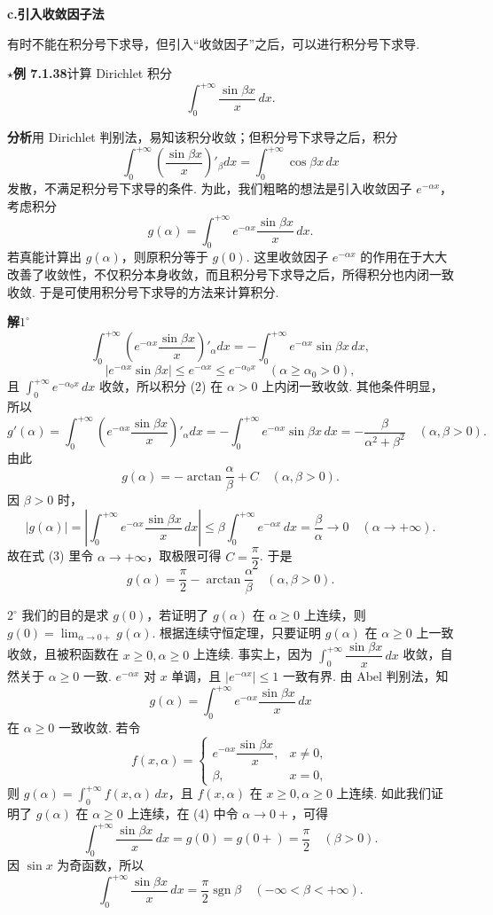 \documentclass[UTF8,12pt,a4paper,fontset=fandol]{ctexart}
\begin{document}
\noindent\textbf{c.\quad 引入收敛因子法}

有时不能在积分号下求导，但引入“收敛因子”之后，可以进行积分号下求导.

\noindent\textbf{$\star$例 7.1.38}\quad 计算 Dirichlet 积分
\[
\int_0^{+\infty}\frac{\sin\beta x}{x}\,dx.
\]

\noindent\textbf{分析}\quad 用 Dirichlet 判别法，易知该积分收敛；但积分号下求导之后，积分
\[
\int_0^{+\infty}\left(\frac{\sin\beta x}{x}\right)'_\beta dx
=\int_0^{+\infty}\cos\beta x\,dx
\]
发散，不满足积分号下求导的条件. 为此，我们粗略的想法是引入收敛因子 $e^{-\alpha x}$，考虑积分
\[
g(\alpha)=\int_0^{+\infty}e^{-\alpha x}\frac{\sin\beta x}{x}\,dx.
\tag{1}
\]
若真能计算出 $g(\alpha)$，则原积分等于 $g(0)$. 这里收敛因子 $e^{-\alpha x}$ 的作用在于大大改善了收敛性，不仅积分本身收敛，而且积分号下求导之后，所得积分也内闭一致收敛. 于是可使用积分号下求导的方法来计算积分.

\noindent\textbf{解}\quad $1^\circ$
\[
\int_0^{+\infty}\left(e^{-\alpha x}\frac{\sin\beta x}{x}\right)'_\alpha dx
=-\int_0^{+\infty}e^{-\alpha x}\sin\beta x\,dx,
\tag{2}
\]
\[
|e^{-\alpha x}\sin\beta x|\le e^{-\alpha x}\le e^{-\alpha_0x}\quad(\alpha\ge\alpha_0>0),
\]
且 $\displaystyle\int_0^{+\infty}e^{-\alpha_0x}\,dx$ 收敛，所以积分 (2) 在 $\alpha>0$ 上内闭一致收敛. 其他条件明显，所以
\[
g'(\alpha)=\int_0^{+\infty}\left(e^{-\alpha x}\frac{\sin\beta x}{x}\right)'_\alpha dx
=-\int_0^{+\infty}e^{-\alpha x}\sin\beta x\,dx
=-\frac{\beta}{\alpha^2+\beta^2}\quad(\alpha,\beta>0).
\]
由此
\[
g(\alpha)=-\arctan\frac{\alpha}{\beta}+C\quad(\alpha,\beta>0).
\tag{3}
\]
因 $\beta>0$ 时，
\[
|g(\alpha)|=\left|\int_0^{+\infty}e^{-\alpha x}\frac{\sin\beta x}{x}\,dx\right|
\le\beta\int_0^{+\infty}e^{-\alpha x}\,dx=\frac{\beta}{\alpha}\to0\quad(\alpha\to+\infty).
\]
故在式 (3) 里令 $\alpha\to+\infty$，取极限可得 $C=\dfrac{\pi}{2}$. 于是
\[
g(\alpha)=\frac{\pi}{2}-\arctan\frac{\alpha}{\beta}\quad(\alpha,\beta>0).
\tag{4}
\]

$2^\circ$ 我们的目的是求 $g(0)$，若证明了 $g(\alpha)$ 在 $\alpha\ge0$ 上连续，则 $g(0)=\displaystyle\lim_{\alpha\to0+}g(\alpha)$. 根据连续守恒定理，只要证明 $g(\alpha)$ 在 $\alpha\ge0$ 上一致收敛，且被积函数在 $x\ge0,\alpha\ge0$ 上连续. 事实上，因为 $\displaystyle\int_0^{+\infty}\dfrac{\sin\beta x}{x}\,dx$ 收敛，自然关于 $\alpha\ge0$ 一致. $e^{-\alpha x}$ 对 $x$ 单调，且 $|e^{-\alpha x}|\le1$ 一致有界. 由 Abel 判别法，知
\[
g(\alpha)=\int_0^{+\infty}e^{-\alpha x}\frac{\sin\beta x}{x}\,dx
\]
在 $\alpha\ge0$ 一致收敛. 若令
\[
f(x,\alpha)=
\begin{cases}
e^{-\alpha x}\dfrac{\sin\beta x}{x}, & x\ne0,\\[0.6em]
\beta, & x=0,
\end{cases}
\]
则 $g(\alpha)=\displaystyle\int_0^{+\infty}f(x,\alpha)\,dx$，且 $f(x,\alpha)$ 在 $x\ge0,\alpha\ge0$ 上连续. 如此我们证明了 $g(\alpha)$ 在 $\alpha\ge0$ 上连续，在 (4) 中令 $\alpha\to0+$，可得
\[
\int_0^{+\infty}\frac{\sin\beta x}{x}\,dx
=g(0)=g(0+)=\frac{\pi}{2}\quad(\beta>0).
\]
因 $\sin x$ 为奇函数，所以
\[
\int_0^{+\infty}\frac{\sin\beta x}{x}\,dx
=\frac{\pi}{2}\operatorname{sgn}\beta\quad(-\infty<\beta<+\infty).
\]
\end{document}
